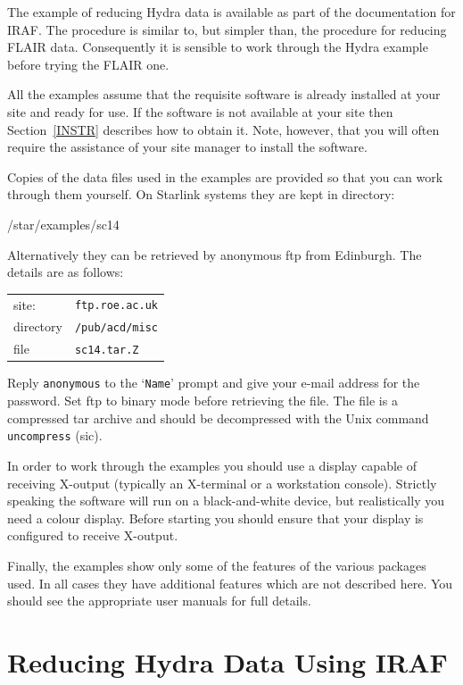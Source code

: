 \documentclass[twoside,11pt]{starlink}
\begin{document}
The example of reducing Hydra data is available as part of the
documentation for IRAF.  The procedure is similar to, but simpler
than, the procedure for reducing FLAIR data.  Consequently it is
sensible to work through the Hydra example before trying the FLAIR
one.

All the examples assume that the requisite software is already installed
at your site and ready for use.  If the software is not available at
your site then Section~\ref{INSTR} describes how to obtain it.  Note,
however, that you will often require the assistance of your site manager
to install the software.

Copies of the data files used in the examples are provided so that you can
work through them yourself.  On Starlink systems they are kept in directory:

\begin{terminalv}
/star/examples/sc14
\end{terminalv}

Alternatively they can be retrieved by anonymous ftp from Edinburgh.
The details are as follows:

\begin{tabular}{ll}
site:     & \texttt{ftp.roe.ac.uk} \\
directory & \texttt{/pub/acd/misc} \\
file      & \texttt{sc14.tar.Z}    \\
\end{tabular}

Reply \texttt{anonymous} to the `\texttt{Name}' prompt and give your e-mail
address for the password.  Set ftp to binary mode before retrieving the
file.  The file is a compressed tar archive and should be decompressed
with the Unix command \texttt{uncompress} (sic).

In order to work through the examples you should use a display capable
of receiving X-output (typically an X-terminal or a workstation console).
Strictly speaking the software will run on a black-and-white device, but
realistically you need a colour display.  Before starting you should
ensure that your display is configured to receive X-output.

Finally, the examples show only some of the features of the various
packages used.  In all cases they have additional features which are not
described here.  You should see the appropriate user manuals for full
details.


\newpage
\section{\label{HYDRA}Reducing Hydra Data Using IRAF}
\end{document}
